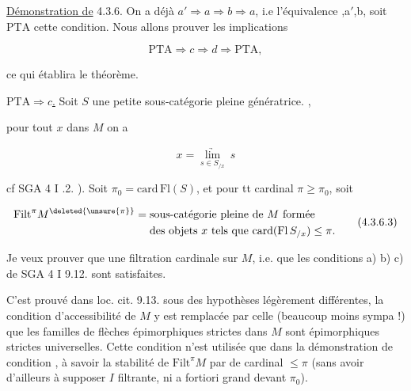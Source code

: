 \uline{Démonstration de} 4.3.6. On a déjà $a'\Rightarrow a\Rightarrow b\Rightarrow a$, i.e l'équivalence ,a$'$,b, soit $\mathrm{PTA}$ cette condition. Nous allons prouver les implications


\[
\mathrm{PTA}\Longrightarrow c\Longrightarrow d\Longrightarrow\mathrm{PTA},
\]

ce qui établira le théorème.

 \uline{$\mathrm{PTA}\Longrightarrow c$.} Soit $S$ une petite sous-catégorie pleine  génératrice.  , 


pour tout $x$ dans $M$ on a

\[
x=\underset{s\in S_{/x}}{\underrightarrow{\lim}}\ s
\tag*{(4.3.6.2)}
\]

cf SGA 4 I .2. ). Soit $\pi_0=\mathrm{card}\,\mathrm{Fl}(S)$,  et pour tt cardinal $\pi\geq\pi_0$, soit

\[
\begin{aligned}
\mathrm{Filt}^{\pi}M^{\deleted{\unsure{\pi}}}
&=\text{sous-catégorie pleine de }M\text{ formée}\\
&\phantom{{}={}}\text{des objets }x\text{ tels que }\mathrm{card}(\mathrm{Fl}\,S_{/x})\leq\pi.
\end{aligned}
\tag*{(4.3.6.3)}
\]

Je veux prouver que   une filtration cardinale sur $M$, i.e. que les conditions a) b) c) de SGA 4 I 9.12. sont satisfaites.

C'est prouvé dans loc. cit. 9.13. sous des  hypothèses légèrement différentes, la condition d'accessibilité de $M$ y est remplacée par celle  (beaucoup moins sympa !) que les familles de flèches épimorphiques strictes dans $M$ sont épimorphiques strictes universelles. Cette condition n'est utilisée que dans la démonstration de  condition , à savoir la stabilité de $\mathrm{Filt}^\pi M$ par   de cardinal $\leq\pi$ (sans avoir d'ailleurs à supposer $I$ filtrante, ni a fortiori grand devant $\pi_0$).

